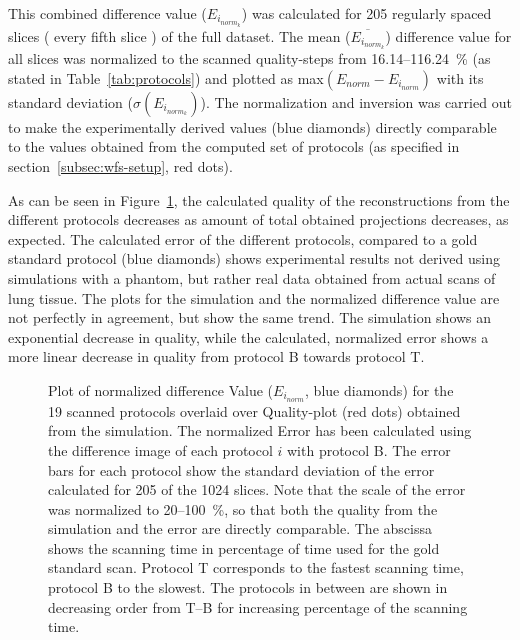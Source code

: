 This combined difference value ($E_{i_{norm_{k}}}$) was calculated for 205 regularly spaced slices (%
every fifth slice%
) of the full dataset. The mean ($\overline{E_{i_{norm_{k}}}}$) difference value for all slices was normalized to the scanned quality-steps from 16.14--\SI{116.24}{\percent} (as stated in Table~\ref{tab:protocols}) and plotted as max$(E_{norm}-E_{i_{norm}})$ with its standard deviation ($\sigma(E_{i_{norm_{k}}})$). The normalization and inversion was carried out to make the experimentally derived values (blue diamonds) directly comparable to the values obtained from the computed set of protocols (as specified in section~\ref{subsec:wfs-setup}, red dots).

As can be seen in Figure~\ref{fig:NormalizedErrorPlot}, the calculated quality of the reconstructions from the different protocols decreases as amount of total obtained projections decreases, as expected. The calculated error of the different protocols, compared to a gold standard protocol (blue diamonds) shows experimental results not derived using simulations with a phantom, but rather real data obtained from actual scans of lung tissue. The plots for the simulation and the normalized difference value are not perfectly in agreement, but show the same trend. The simulation shows an exponential decrease in quality, while the calculated, normalized error shows a more linear decrease in quality from protocol B towards protocol T.

\begin{figure}
	\centering
	\caption{Plot of normalized difference Value ($E_{i_{norm}}$, blue diamonds) for the 19 scanned protocols overlaid over Quality-plot (red dots) obtained from the simulation. The normalized Error has been calculated using the difference image of each protocol $i$ with protocol B. The error bars for each protocol show the standard deviation of the error calculated for 205 of the 1024 slices. Note that the scale of the error was normalized to 20--\SI{100}{\percent}, so that both the quality from the simulation and the error are directly comparable. The abscissa shows the scanning time in percentage of time used for the gold standard scan. Protocol T corresponds to the fastest scanning time, protocol B to the slowest. The protocols in between are shown in decreasing order from T--B for increasing percentage of the scanning time.}
	\ifiucr		
		
	\else
	\fi
	\label{fig:NormalizedErrorPlot}
\end{figure}

